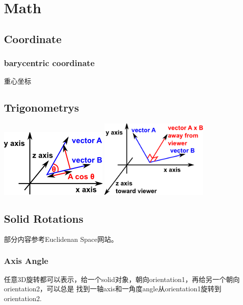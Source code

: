 \chapter{Math}

\section{Coordinate}

\subsection{barycentric coordinate}
重心坐标


\section{Trigonometrys}

\begin{center}
    \includegraphics[width=0.4\textwidth]{images/dotProduct.png}
    \includegraphics[width=0.4\textwidth]{images/crossProduct.png}
\end{center}


\section{Solid Rotations}

部分内容参考Euclidenan Space网站\cite{Euclideanspace}。

\subsection{Axis Angle}

任意3D旋转都可以表示，给一个solid对象，朝向orientation1，再给另一个朝向orientation2，可以总是
找到一轴axis和一角度angle从orientation1旋转到orientation2.

